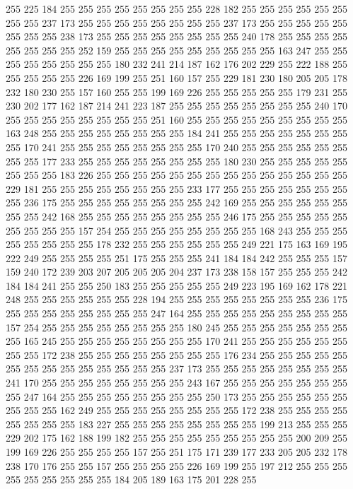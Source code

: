 255 225 184 255 255 255 255 255 255 255 255 228 182 255 255 255 255 255 255 255
255 237 173 255 255 255 255 255 255 255 255 237 173 255 255 255 255 255 255 255
255 238 173 255 255 255 255 255 255 255 255 240 178 255 255 255 255 255 255 255
255 252 159 255 255 255 255 255 255 255 255 255 163 247 255 255 255 255 255 255
255 255 180 232 241 214 187 162 176 202 229 255 222 188 255 255 255 255 255 226
169 199 255 251 160 157 255 229 181 230 180 205 205 178 232 180 230 255 157 160
255 255 199 169 226 255 255 255 255 255 179 231 255 230 202 177 162 187 214 241
223 187 255 255 255 255 255 255 255 255 240 170 255 255 255 255 255 255 255 255
251 160 255 255 255 255 255 255 255 255 255 163 248 255 255 255 255 255 255 255
255 184 241 255 255 255 255 255 255 255 255 170 241 255 255 255 255 255 255 255
255 170 240 255 255 255 255 255 255 255 255 177 233 255 255 255 255 255 255 255
255 180 230 255 255 255 255 255 255 255 255 183 226 255 255 255 255 255 255 255
255 255 255 255 255 255 255 229 181 255 255 255 255 255 255 255 255 233 177 255
255 255 255 255 255 255 255 236 175 255 255 255 255 255 255 255 255 242 169 255
255 255 255 255 255 255 255 242 168 255 255 255 255 255 255 255 255 246 175 255
255 255 255 255 255 255 255 255 157 254 255 255 255 255 255 255 255 255 168 243
255 255 255 255 255 255 255 255 178 232 255 255 255 255 255 255 249 221 175 163
169 195 222 249 255 255 255 255 251 175 255 255 255 241 184 184 242 255 255 255
157 159 240 172 239 203 207 205 205 205 204 237 173 238 158 157 255 255 255 242
184 184 241 255 255 250 183 255 255 255 255 255 249 223 195 169 162 178 221 248
255 255 255 255 255 255 228 194 255 255 255 255 255 255 255 255 236 175 255 255
255 255 255 255 255 255 247 164 255 255 255 255 255 255 255 255 255 157 254 255
255 255 255 255 255 255 255 180 245 255 255 255 255 255 255 255 255 165 245 255
255 255 255 255 255 255 255 170 241 255 255 255 255 255 255 255 255 172 238 255
255 255 255 255 255 255 255 176 234 255 255 255 255 255 255 255 255 255 255 255
255 255 255 237 173 255 255 255 255 255 255 255 255 241 170 255 255 255 255 255
255 255 255 243 167 255 255 255 255 255 255 255 255 247 164 255 255 255 255 255
255 255 255 250 173 255 255 255 255 255 255 255 255 255 162 249 255 255 255 255
255 255 255 255 172 238 255 255 255 255 255 255 255 255 183 227 255 255 255 255
255 255 255 255 199 213 255 255 255 229 202 175 162 188 199 182 255 255 255 255
255 255 255 255 255 200 209 255 199 169 226 255 255 255 255 157 255 251 175 171
239 177 233 205 205 232 178 238 170 176 255 255 157 255 255 255 255 226 169 199
255 197 212 255 255 255 255 255 255 255 255 255 184 205 189 163 175 201 228 255
